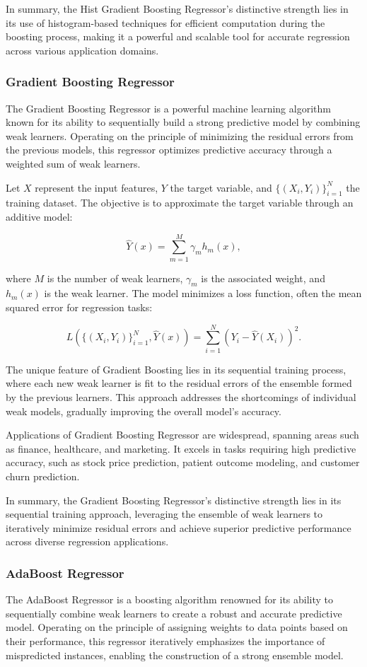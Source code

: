 \documentclass[twocolumn]{article}
\begin{document}
In summary, the Hist Gradient Boosting Regressor's distinctive strength lies in its use of histogram-based techniques for efficient computation during the boosting process, making it a powerful and scalable tool for accurate regression across various application domains.

		\subsubsection{Gradient Boosting Regressor}
The Gradient Boosting Regressor is a powerful machine learning algorithm known for its ability to sequentially build a strong predictive model by combining weak learners. Operating on the principle of minimizing the residual errors from the previous models, this regressor optimizes predictive accuracy through a weighted sum of weak learners.

Let \(X\) represent the input features, \(Y\) the target variable, and \(\{ (X_i, Y_i) \}_{i=1}^{N}\) the training dataset. The objective is to approximate the target variable through an additive model:

\[ \hat{Y}(x) = \sum_{m=1}^{M} \gamma_m h_m(x), \]

where \(M\) is the number of weak learners, \(\gamma_m\) is the associated weight, and \(h_m(x)\) is the weak learner. The model minimizes a loss function, often the mean squared error for regression tasks:

\[ L(\{ (X_i, Y_i) \}_{i=1}^{N}, \hat{Y}(x)) = \sum_{i=1}^{N} (Y_i - \hat{Y}(X_i))^2. \]

The unique feature of Gradient Boosting lies in its sequential training process, where each new weak learner is fit to the residual errors of the ensemble formed by the previous learners. This approach addresses the shortcomings of individual weak models, gradually improving the overall model's accuracy.

Applications of Gradient Boosting Regressor are widespread, spanning areas such as finance, healthcare, and marketing. It excels in tasks requiring high predictive accuracy, such as stock price prediction, patient outcome modeling, and customer churn prediction.

In summary, the Gradient Boosting Regressor's distinctive strength lies in its sequential training approach, leveraging the ensemble of weak learners to iteratively minimize residual errors and achieve superior predictive performance across diverse regression applications.

		\subsubsection{AdaBoost Regressor}
The AdaBoost Regressor is a boosting algorithm renowned for its ability to sequentially combine weak learners to create a robust and accurate predictive model. Operating on the principle of assigning weights to data points based on their performance, this regressor iteratively emphasizes the importance of mispredicted instances, enabling the construction of a strong ensemble model.
\end{document}
